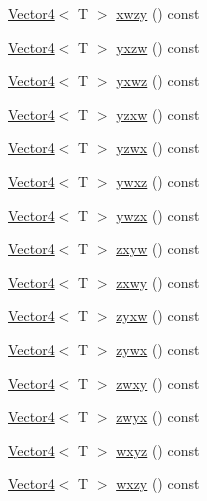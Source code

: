 \begin{DoxyCompactItemize}
\item 
\mbox{\hyperlink{class_vector4}{Vector4}}$<$ T $>$ \mbox{\hyperlink{class_vector4_a192e0d572d635a87bf356201bb16c5ce}{xwzy}} () const
\item 
\mbox{\hyperlink{class_vector4}{Vector4}}$<$ T $>$ \mbox{\hyperlink{class_vector4_ae52ef26b0b1a59790fe734a51c646f5c}{yxzw}} () const
\item 
\mbox{\hyperlink{class_vector4}{Vector4}}$<$ T $>$ \mbox{\hyperlink{class_vector4_aa8b094a794505c18e41844d60f7e36e7}{yxwz}} () const
\item 
\mbox{\hyperlink{class_vector4}{Vector4}}$<$ T $>$ \mbox{\hyperlink{class_vector4_a2b21ad926428f4e95d4edf310470087a}{yzxw}} () const
\item 
\mbox{\hyperlink{class_vector4}{Vector4}}$<$ T $>$ \mbox{\hyperlink{class_vector4_ababd977a9e4a09dcd5a0058fb52367ff}{yzwx}} () const
\item 
\mbox{\hyperlink{class_vector4}{Vector4}}$<$ T $>$ \mbox{\hyperlink{class_vector4_a2025a5efe716031e2c6014f3f01ef05c}{ywxz}} () const
\item 
\mbox{\hyperlink{class_vector4}{Vector4}}$<$ T $>$ \mbox{\hyperlink{class_vector4_a3b09382c6fad1d44e20852d3948d070f}{ywzx}} () const
\item 
\mbox{\hyperlink{class_vector4}{Vector4}}$<$ T $>$ \mbox{\hyperlink{class_vector4_a11a11ad01317a703765646b26deb5373}{zxyw}} () const
\item 
\mbox{\hyperlink{class_vector4}{Vector4}}$<$ T $>$ \mbox{\hyperlink{class_vector4_acde5342f5d2865a0e0a451ecf57ed4d8}{zxwy}} () const
\item 
\mbox{\hyperlink{class_vector4}{Vector4}}$<$ T $>$ \mbox{\hyperlink{class_vector4_a0afd1b5b8b0797eed6b2b90ab2a38761}{zyxw}} () const
\item 
\mbox{\hyperlink{class_vector4}{Vector4}}$<$ T $>$ \mbox{\hyperlink{class_vector4_ae8f4f0248ef183d1562110990939568a}{zywx}} () const
\item 
\mbox{\hyperlink{class_vector4}{Vector4}}$<$ T $>$ \mbox{\hyperlink{class_vector4_a3f285f0892d366a95fc51a525c3716d1}{zwxy}} () const
\item 
\mbox{\hyperlink{class_vector4}{Vector4}}$<$ T $>$ \mbox{\hyperlink{class_vector4_a7b42f77641550057ea5959eddf93a05f}{zwyx}} () const
\item 
\mbox{\hyperlink{class_vector4}{Vector4}}$<$ T $>$ \mbox{\hyperlink{class_vector4_afc590c08279fd1302d3f03758fff67ea}{wxyz}} () const
\item 
\mbox{\hyperlink{class_vector4}{Vector4}}$<$ T $>$ \mbox{\hyperlink{class_vector4_a5eca626d3f954645d0524e906692871f}{wxzy}} () const

\end{DoxyCompactItemize}
